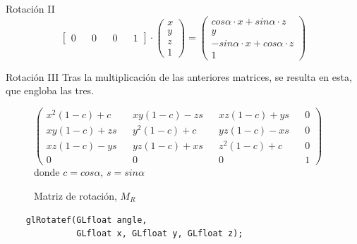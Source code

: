 \documentclass{beamer}
\begin{document}
\begin{frame}{Rotación II}
\begin{equation*}
\begin{bmatrix}
    0 && 0 && 0 && 1
  \end{bmatrix}
  \cdot
  \begin{pmatrix}
    x \\ y \\ z \\ 1
  \end{pmatrix}
  =
  \begin{pmatrix}
    cos \alpha \cdot x + sin \alpha \cdot z \\
    y \\
    - sin \alpha \cdot x + cos \alpha \cdot z \\
    1
  \end{pmatrix}
\end{equation*}

\end{frame}

\begin{frame}[fragile]{Rotación III}
  Tras la multiplicación de las anteriores matrices, se resulta en esta, que engloba las tres.
  \begin{figure} [ht]
  \centering
  \(
  \begin{pmatrix}
    x^2(1-c) + c  && xy(1-c) - zs && xz(1-c) + ys && 0\\
    xy(1-c) + zs && y^2(1-c) + c  && yz(1-c) - xs && 0\\
    xz(1-c) - ys && yz(1-c) + xs && z^2(1-c) + c  && 0\\
    0 && 0 && 0 && 1
  \end{pmatrix}
  \)
  \\donde $c = cos \alpha$, $s = sin \alpha$ 
  \caption*{Matriz de rotación, $M_R$}
  \end{figure}

  \begin{lstlisting}
    glRotatef(GLfloat angle,
              GLfloat x, GLfloat y, GLfloat z);
  \end{lstlisting}
\end{frame}
\end{document}
